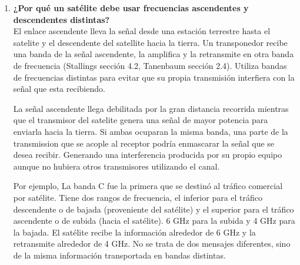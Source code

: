 \documentclass[11pt,a4paper]{article}
\begin{document}
\begin{enumerate}[label=4.\arabic*), itemsep=0.3cm]
\begin{figure}[h]
\end{figure}
  \item
        \textbf{¿Por qué un satélite debe usar frecuencias ascendentes y descendentes distintas?} \\
        El enlace ascendente lleva la señal desde una estación terrestre hasta el satelite y el descendente del satellite hacia la tierra. Un transponedor recibe una banda de la señal ascendente, la amplifica y la retransmite en otra banda de frecuencia (Stallings sección 4.2, Tanenbaum sección 2.4). Utiliza bandas de frecuencias distintas para evitar que su propia transmisión interfiera con la señal que esta recibiendo.
        
        La señal  ascendente llega debilitada por la gran distancia recorrida mientras que el transmisor del satelite genera una señal de mayor potencia para enviarla hacia la tierra. Si ambas ocuparan la misma banda, una parte de la transmission que se acople al receptor podría enmascarar la señal que se desea recibir. Generando una interferencia producida por su propio equipo aunque no hubiera otros transmisores utilizando el canal.
        
        Por ejemplo, La banda C fue la primera que se destinó al tráfico comercial por satélite. Tiene dos rangos de frecuencia, el inferior para el tráfico descendente o de bajada (proveniente del satélite) y el superior para el tráfico ascendente o de subida (hacia el satélite). 6 GHz para la subida y 4 GHz para la bajada. El satélite recibe la información alrededor de 6 GHz y la retransmite alrededor de 4 GHz. No se trata de dos mensajes diferentes, sino de la misma información transportada en bandas distintas.
        

\end{enumerate}
\end{document}
